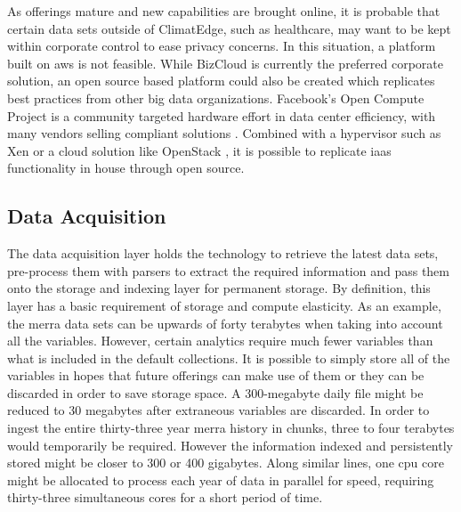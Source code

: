 As offerings mature and new capabilities are brought online, it is probable that certain data sets outside of ClimatEdge, such as healthcare, may want to be kept within corporate control to ease privacy concerns. In this situation, a platform built on \gls{aws} is not feasible. While BizCloud is currently the preferred corporate solution, an open source based platform could also be created which replicates best practices from other big data organizations. Facebook's Open Compute Project is a community targeted hardware effort in data center efficiency, with many vendors selling compliant solutions \cite{opencompute}. Combined with a hypervisor such as Xen \cite{xen} or a cloud solution like OpenStack \cite{openstack}, it is possible to replicate \gls{iaas} functionality in house through open source.
\subsection{Data Acquisition}
The data acquisition layer holds the technology to retrieve the latest data sets, pre-process them with parsers  to extract the required information and pass them onto the storage and indexing layer for permanent storage. By definition, this layer has a basic requirement of storage and compute elasticity. As an example, the \gls{merra} data sets can be upwards of forty terabytes when taking into account all the variables. However, certain analytics require much fewer variables than what is included in the default collections. It is possible to simply store all of the variables in hopes that future offerings can make use of them or they can be discarded in order to save storage space. A 300-megabyte daily file might be reduced to 30 megabytes after extraneous variables are discarded. In order to ingest the entire thirty-three year \gls{merra} history in chunks, three to four terabytes would  temporarily be required. However the information indexed and persistently stored might be closer to 300 or 400 gigabytes. Along similar lines, one \gls{cpu} core might be allocated to process each year of data in parallel for speed, requiring thirty-three simultaneous cores for a short period of time. \\

